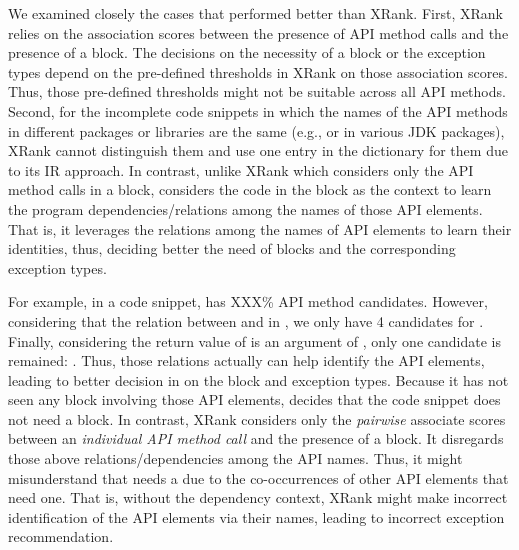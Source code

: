 We examined closely the cases that {\tool} performed better than
XRank.  First, XRank relies on the association scores between the
presence of API method calls and the presence of a 
block. The decisions on the necessity of a  block or
the exception types depend on the pre-defined thresholds in XRank on
those association scores. Thus, those pre-defined thresholds might not
be suitable across all API methods. Second, for the incomplete
code snippets in which the names of the API methods in different
packages or libraries are the same (e.g.,  or
 in various JDK packages), XRank cannot distinguish them
and use one entry in the dictionary for them due to its IR
approach. In contrast, unlike XRank which considers only the API
method calls in a  block, {\tool} considers the code in
the block as the context to learn the program dependencies/relations among the
names of those API elements. That is, it leverages the relations among
the names of API elements to learn their identities, thus,
deciding better the need of  blocks and the
corresponding exception types.

For example, in a code snippet,  has XXX\% API method
candidates. However, considering that the relation between 
and  in , we only have
4 candidates for . Finally, considering the return value
of  is an argument of , only one
candidate is remained:
.
Thus, those relations actually can help identify the API elements,
leading to better decision in {\tool} on the  block
and exception types. Because it has not seen any 
block involving those API elements, {\tool} decides that the code
snippet does not need a  block. In contrast, XRank
considers only the {\em pairwise} associate scores between an {\em
  individual API method call} and the presence of a 
block. It disregards those above relations/dependencies among the API
names. Thus, it might misunderstand that  needs a
 due to the co-occurrences of other API elements that
need one. That is, without the dependency context, XRank might
make incorrect identification of the API elements via their names,
leading to incorrect exception recommendation.



